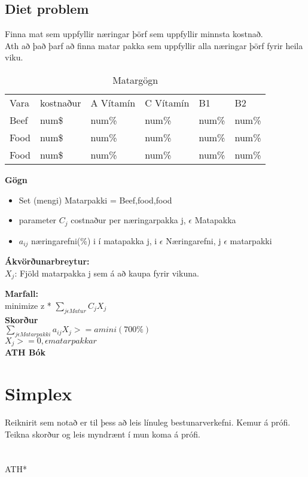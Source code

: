 \documentclass[]{article}
\begin{document}
\subsection*{Diet problem}
Finna mat sem uppfyllir næringar þörf sem uppfyllir minnsta kostnað.\\
Ath að það þarf að finna matar pakka sem uppfyllir alla næringar þörf fyrir heila viku.\\

\begin{table}[h]
	\centering
	\caption{Matargögn}
	\label{my-label}
	\begin{tabular}{llllll}
		Vara & kostnaður & A Vítamín & C Vítamín & B1    & B2    \\
		Beef & num\$     & num\%     & num\%     & num\% & num\% \\   
		Food & num\$     & num\%     & num\%     & num\% & num\% \\
		Food & num\$     & num\%     & num\%     & num\% & num\% \\
	\end{tabular}
\end{table}

\textbf{Gögn}

\begin{itemize}
	\item Set (mengi) Matarpakki = {Beef,food,food}
	\item parameter $C_{j}$ costnaður per næringarpakka j, $\epsilon$ Matapakka 
	\item $a_{ij}$ næringarefni(\%) i í matapakka j, i $\epsilon$ Næringarefni, j $\epsilon$ matarpakki
\end{itemize}

\textbf{Ákvörðunarbreytur:}\\
$X_{j}$: Fjöld matarpakka j sem á að kaupa fyrir vikuna.

\textbf{Marfall:} \\
minimize z * $\sum\limits_{j \epsilon Matur}^{} C_{j}X_{j}$\\

\textbf{Skorður} \\
$\sum\limits_{j \epsilon Matarpakki}^{} a_{ij}X_{j} >= amini (700\%)$\\
$X_{j} >= 0, \epsilon matarpakkar$\\

\textbf{ATH Bók}\\

\section*{Simplex}
Reiknirit sem notað er til þess að leis línuleg bestunarverkefni. Kemur á prófi.\\
Teikna skorður og leis myndrænt í mun koma á prófi. \\
\\
\\
ATH* 
\end{document}
